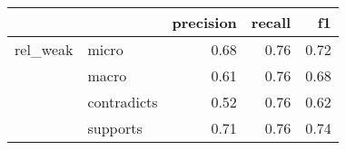 \begin{tabular}{llrrr}
\toprule
         &          &  precision &  recall &   f1 \\
\midrule
rel\_weak & micro &       0.68 &    0.76 & 0.72 \\
         & macro &       0.61 &    0.76 & 0.68 \\
         & contradicts &       0.52 &    0.76 & 0.62 \\
         & supports &       0.71 &    0.76 & 0.74 \\
\bottomrule
\end{tabular}
